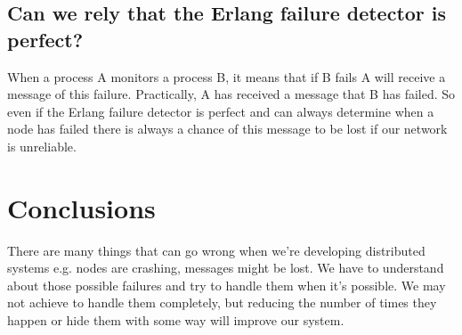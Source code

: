 \documentclass[a4paper, 11pt]{article}
\begin{document}
\subsection{Can we rely that the Erlang failure detector is perfect?}
When a process A monitors a process B, it means that if B fails A will receive a message of this failure. Practically, A has received a message that B has failed.
So even if the Erlang failure detector is perfect and can always determine when a node has failed there is always a chance of this message to be lost if our network is unreliable.


\section{Conclusions}
There are many things that can go wrong when we're developing distributed systems e.g. nodes are crashing, messages might be lost. We have to understand about those possible failures and try to handle them when it's possible. We may not achieve to handle them completely, but reducing the number of times they happen or hide them with some way will improve our system.
\end{document}
